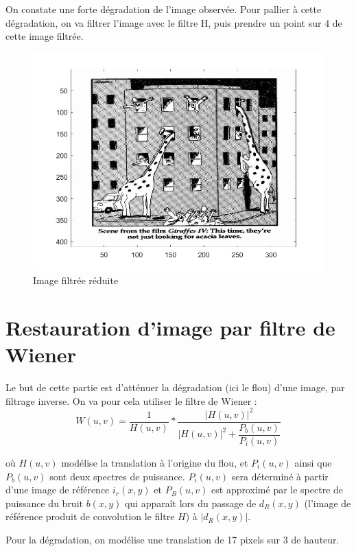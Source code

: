 \documentclass[10pt,a4paper]{article}
\begin{document}
On constate une forte dégradation de l'image observée. Pour pallier à cette dégradation, on va filtrer l'image avec le filtre H, puis prendre un point sur 4 de cette image filtrée.

\begin{figure}[H]	\begin{center}
\includegraphics[scale=0.35]{imfiltree_reduite.jpg}
\caption{Image filtrée réduite	}
\label{XX}
\end{center}	\end{figure}


\section{Restauration d'image par filtre de Wiener}
Le but de cette partie est d'atténuer la dégradation (ici le flou) d'une image, par filtrage inverse. On va pour cela utiliser le filtre de Wiener : 
\[
	W(u,v) = \frac{1}{H(u,v)} * \frac{|H(u,v)|^2}{|H(u,v)|^2+\dfrac{P_b(u,v)}{P_i (u,v)}}	
\]

où $H(u,v)$ modélise la translation à l'origine du flou, et $P_i(u,v)$ ainsi que $P_b(u,v)$ sont deux spectres de puissance. $P_i(u,v)$ sera déterminé à partir d'une image de référence $i_r(x,y)$ et $P_B(u,v)$ est approximé par le spectre de puissance du bruit $b(x,y)$ qui apparaît lors du passage de $d_R(x,y)$ (l'image de référence produit de convolution le filtre $H$) à $|d_R(x,y)|$.

Pour la dégradation, on modélise une translation de 17 pixels sur 3 de hauteur.
\end{document}
